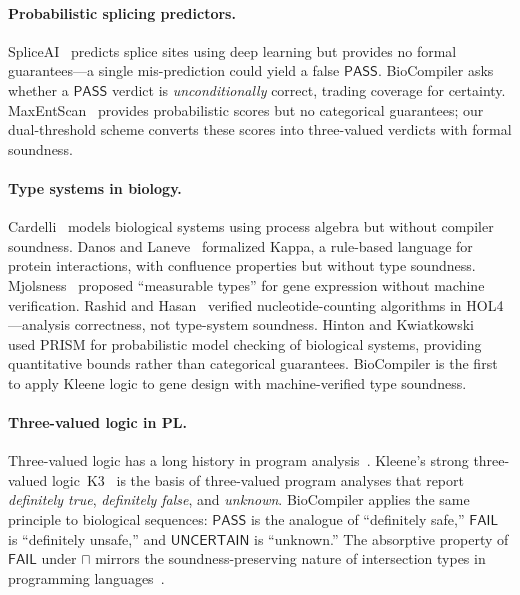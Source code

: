 \documentclass[runningheads]{llncs}
\newcommand{\PASS}{\ensuremath{\mathsf{PASS}}\xspace}
\newcommand{\FAIL}{\ensuremath{\mathsf{FAIL}}\xspace}
\newcommand{\UNCERTAIN}{\ensuremath{\mathsf{UNCERTAIN}}\xspace}
\begin{document}
\paragraph{Probabilistic splicing predictors.}
SpliceAI~\cite{jaganathan2019spliceai} predicts splice sites using
deep learning but provides no formal guarantees---a single
mis-prediction could yield a false \PASS.
BioCompiler asks whether a \PASS{} verdict is \emph{unconditionally}
correct, trading coverage for certainty.
MaxEntScan~\cite{yarden2006maxentscan} provides probabilistic scores
but no categorical guarantees; our dual-threshold scheme converts
these scores into three-valued verdicts with formal soundness.

\paragraph{Type systems in biology.}
Cardelli~\cite{cardelli2008process} models biological systems using
process algebra but without compiler soundness.
Danos and Laneve~\cite{danos2004formal} formalized Kappa, a
rule-based language for protein interactions, with confluence
properties but without type soundness.
Mjolsness~\cite{mjolsness2010measurable} proposed ``measurable
types'' for gene expression without machine verification.
Rashid and Hasan~\cite{rashid2017hol4} verified nucleotide-counting
algorithms in HOL4---analysis correctness, not type-system soundness.
Hinton and Kwiatkowski~\cite{hinton2004prism} used PRISM for
probabilistic model checking of biological systems, providing
quantitative bounds rather than categorical guarantees.
BioCompiler is the first to apply Kleene logic to gene design with
machine-verified type soundness.

\paragraph{Three-valued logic in PL.}
Three-valued logic has a long history in program
analysis~\cite{clarke2000model,sagiv2002parametric}.
Kleene's strong three-valued logic~K3~\cite{kleene1952introduction} is
the basis of three-valued program analyses that report \emph{definitely
true}, \emph{definitely false}, and \emph{unknown}.
BioCompiler applies the same principle to biological sequences: \PASS{}
is the analogue of ``definitely safe,'' \FAIL{} is ``definitely
unsafe,'' and \UNCERTAIN{} is ``unknown.''
The absorptive property of \FAIL{} under $\sqcap$ mirrors the
soundness-preserving nature of intersection types in programming
languages~\cite{pierce2002types,wright1994syntactic}.
\end{document}
